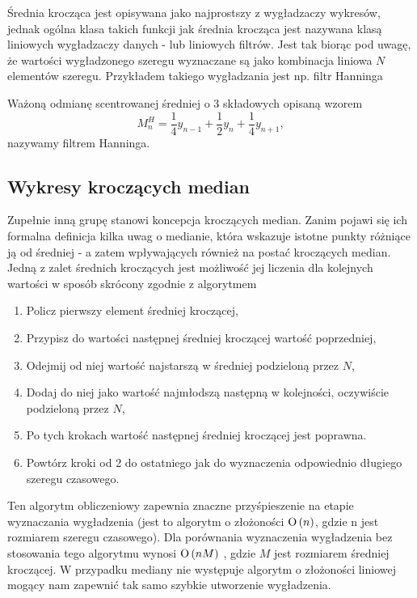 \documentclass[10pt,a4paper]{book}
\begin{document}
Średnia krocząca jest opisywana jako najprostszy z wygładzaczy wykresów, jednak ogólna klasa takich funkcji jak średnia krocząca jest nazywana klasą liniowych wygładzaczy danych - lub liniowych filtrów. Jest tak biorąc pod uwagę, że wartości wygładzonego szeregu wyznaczane są jako kombinacja liniowa $N$ elementów szeregu. Przykładem takiego wygładzania jest np. filtr Hanninga

\begin{definition}
Ważoną odmianę scentrowanej średniej o 3 składowych opisaną wzorem
$$
M_n^H = \frac{1}{4} y_{n-1} + \frac{1}{2} y_n + \frac{1}{4} y_{n+1},
$$
nazywamy filtrem Hanninga.
\end{definition}

\subsection{Wykresy kroczących median}

Zupełnie inną grupę stanowi koncepcja kroczących median. Zanim pojawi się ich formalna definicja kilka uwag o medianie, która wskazuje istotne punkty różniące ją od średniej - a zatem wpływających również na postać kroczących median. Jedną z zalet średnich kroczących jest możliwość jej liczenia dla kolejnych wartości w sposób skrócony zgodnie z algorytmem

\begin{enumerate}
\item Policz pierwszy element średniej kroczącej,
\item Przypisz do wartości następnej średniej kroczącej wartość poprzedniej,
\item Odejmij od niej wartość najstarszą w średniej podzieloną przez $N$,
\item Dodaj do niej jako wartość najmłodszą następną w kolejności, oczywiście podzieloną przez $N$,
\item Po tych krokach wartość następnej średniej kroczącej jest poprawna.
\item Powtórz kroki od 2 do ostatniego jak do wyznaczenia odpowiednio długiego szeregu czasowego.
\end{enumerate}

Ten algorytm obliczeniowy zapewnia znaczne przyśpieszenie na etapie wyznaczania wygładzenia (jest to algorytm o złożoności $\operatorname{O} \left( {n} \right)$, gdzie n jest rozmiarem szeregu czasowego). Dla porównania wyznaczenia wygładzenia bez stosowania tego algorytmu wynosi $\operatorname{O} \left( {n M} \right)$ , gdzie $M$ jest rozmiarem średniej kroczącej. W przypadku mediany nie występuje algorytm o złożoności liniowej mogący nam zapewnić tak samo szybkie utworzenie wygładzenia.
\end{document}
